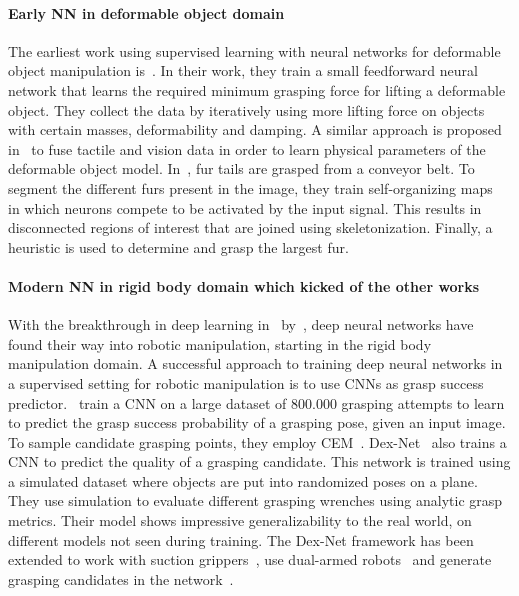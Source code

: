 \documentclass[\home/main.tex]{subfiles}
\begin{document}
\paragraph{Early NN in deformable object domain}
The earliest work using supervised learning with neural networks for deformable object manipulation is~\textcite{Howard2000}. In their work, they train a small feedforward neural network that learns the required minimum grasping force for lifting a deformable object. They collect the data by iteratively using more lifting force on objects with certain masses, deformability and damping. A similar approach is proposed in~\autocite{Khalil2007} to fuse tactile and vision data in order to learn physical parameters of the deformable object model. In~\autocite{Foresti2004}, fur tails are grasped from a conveyor belt. To segment the different furs present in the image, they train self-organizing maps~\autocite{Kohonen1982} in which neurons compete to be activated by the input signal. This results in disconnected regions of interest that are joined using skeletonization. Finally, a heuristic is used to determine and grasp the largest fur.

\paragraph{Modern NN in rigid body domain which kicked of the other works}
With the breakthrough in deep learning in~\citeyear{Krizhevsky2012} by~\textcite{Krizhevsky2012}, deep neural networks have found their way into robotic manipulation, starting in the rigid body manipulation domain. A successful approach to training deep neural networks in a supervised setting for robotic manipulation is to use \glspl{CNN} as grasp success predictor.~\textcite{Levine2016} train a \gls{CNN} on a large dataset of $800.000$ grasping attempts to learn to predict the grasp success probability of a grasping pose, given an input image. To sample candidate grasping points, they employ CEM~\autocite{CEM}. Dex-Net~\autocite{dexnet2} also trains a \gls{CNN} to predict the quality of a grasping candidate. This network is trained using a simulated dataset where objects are put into randomized poses on a plane. They use simulation to evaluate different grasping wrenches using analytic grasp metrics. Their model shows impressive generalizability to the real world, on different models not seen during training. The Dex-Net framework has been extended to work with suction grippers~\autocite{dexnet3}, use dual-armed robots~\autocite{dexnet4} and generate grasping candidates in the network~\autocite{Satish2019}.
\end{document}
